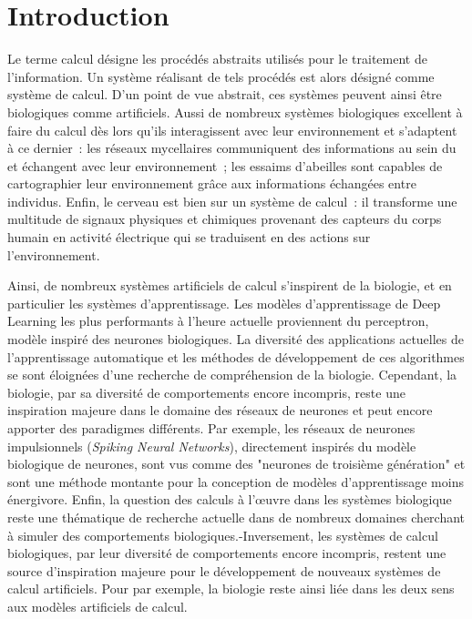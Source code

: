 \section*{Introduction}

Le terme calcul désigne les procédés abstraits utilisés pour le traitement de l'information. 
Un système réalisant de tels procédés est alors désigné comme système de calcul. 
D'un point de vue abstrait, ces systèmes peuvent ainsi être biologiques comme artificiels.
Aussi de nombreux systèmes biologiques excellent à faire du calcul dès lors qu'ils interagissent avec leur environnement et s'adaptent à ce dernier~: les réseaux mycellaires communiquent des informations au sein du et échangent avec leur environnement~; les essaims d'abeilles sont capables de cartographier leur environnement grâce aux informations échangées entre individus. Enfin, le cerveau est bien sur un système de calcul~: il transforme une multitude de signaux physiques et chimiques provenant des capteurs du corps humain en activité électrique qui se traduisent en des actions sur l'environnement.

Ainsi, de nombreux systèmes artificiels de calcul s'inspirent de la biologie, et en particulier les systèmes d'apprentissage. 
Les modèles d'apprentissage de Deep Learning les plus performants à l'heure actuelle proviennent du perceptron, modèle inspiré des neurones biologiques.
La diversité des applications actuelles de l'apprentissage automatique et les méthodes de développement de ces algorithmes se sont éloignées d'une recherche de compréhension de la biologie. 
Cependant, la biologie, par sa diversité de comportements encore incompris, reste une inspiration majeure dans le domaine des réseaux de neurones et peut encore apporter des paradigmes différents.
Par exemple, les réseaux de neurones impulsionnels (\emph{Spiking Neural Networks}), directement inspirés du modèle biologique de neurones, sont vus comme des "neurones de troisième génération" et sont une méthode montante pour la conception de modèles d'apprentissage moins énergivore.
Enfin, la question des calculs à l'\oe{}uvre dans les systèmes biologique reste une thématique de recherche actuelle dans de nombreux domaines cherchant à simuler des comportements biologiques.-Inversement, les systèmes  de calcul biologiques, par leur diversité de comportements encore incompris, restent une source d'inspiration majeure pour le développement de nouveaux systèmes de calcul artificiels.
Pour \cite{Oudeyer2010OnTI} par exemple, la biologie reste ainsi liée dans les deux sens aux modèles artificiels de calcul.

